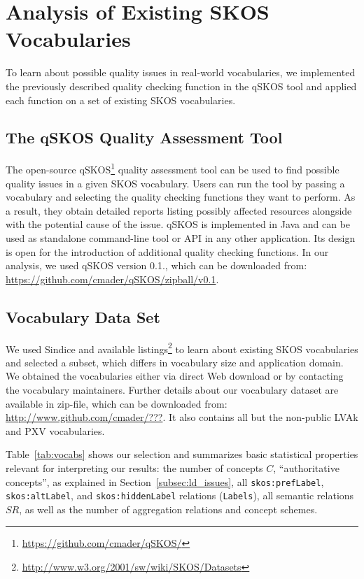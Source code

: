 
\section{Analysis of Existing SKOS Vocabularies}\label{sec:analysis}

To learn about possible quality issues in real-world vocabularies, we implemented the previously described quality checking function in the qSKOS tool and applied each function on a set of existing SKOS vocabularies.

\subsection{The qSKOS Quality Assessment Tool}

The open-source qSKOS\footnote{\url{https://github.com/cmader/qSKOS/}} quality assessment tool can be used to find possible quality issues in a given SKOS vocabulary. Users can run the tool by passing a vocabulary and selecting the quality checking functions they want to perform. As a result, they obtain detailed reports listing possibly affected resources alongside with the potential cause of the issue. qSKOS is implemented in Java and can be used as standalone command-line tool or API in any other application. Its design is open for the introduction of additional quality checking functions. In our analysis, we used qSKOS version 0.1., which can be downloaded from: \url{https://github.com/cmader/qSKOS/zipball/v0.1}.

\subsection{Vocabulary Data Set}

We used Sindice and available listings\footnote{\url{http://www.w3.org/2001/sw/wiki/SKOS/Datasets}} to learn about existing SKOS vocabularies and selected a subset, which differs in vocabulary size and application domain. We obtained the vocabularies either via direct Web download or by contacting the vocabulary maintainers. Further details about our vocabulary dataset are available in zip-file, which can be downloaded from: \url{http://www.github.com/cmader/???}. It also contains all but the non-public LVAk and PXV vocabularies.

Table~\ref{tab:vocabs} shows our selection and summarizes basic statistical properties relevant for interpreting our results: the number of concepts $C$, ``authoritative concepts'', as explained in Section~\ref{subsec:ld_issues}, all \texttt{skos:prefLabel}, \texttt{skos:altLabel}, and \texttt{skos:hiddenLabel} relations (\texttt{Labels}), all semantic relations $SR$, as well as the number of aggregation relations and concept schemes.



